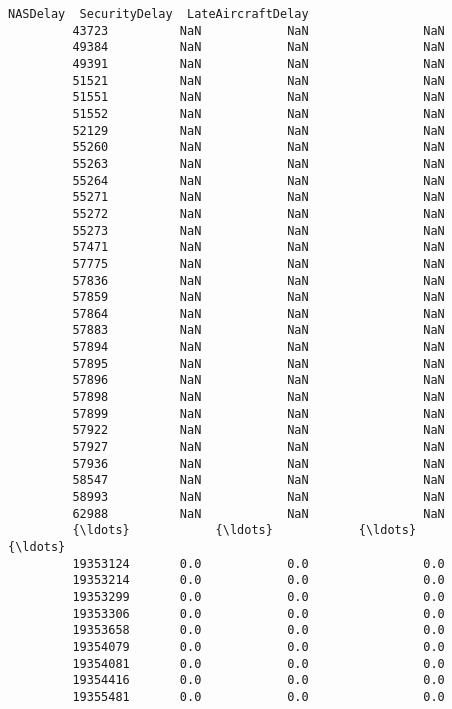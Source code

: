 \documentclass[11pt]{article}
\begin{document}
\begin{Verbatim}[commandchars=\\\{\}]
                   NASDelay  SecurityDelay  LateAircraftDelay  
         43723          NaN            NaN                NaN  
         49384          NaN            NaN                NaN  
         49391          NaN            NaN                NaN  
         51521          NaN            NaN                NaN  
         51551          NaN            NaN                NaN  
         51552          NaN            NaN                NaN  
         52129          NaN            NaN                NaN  
         55260          NaN            NaN                NaN  
         55263          NaN            NaN                NaN  
         55264          NaN            NaN                NaN  
         55271          NaN            NaN                NaN  
         55272          NaN            NaN                NaN  
         55273          NaN            NaN                NaN  
         57471          NaN            NaN                NaN  
         57775          NaN            NaN                NaN  
         57836          NaN            NaN                NaN  
         57859          NaN            NaN                NaN  
         57864          NaN            NaN                NaN  
         57883          NaN            NaN                NaN  
         57894          NaN            NaN                NaN  
         57895          NaN            NaN                NaN  
         57896          NaN            NaN                NaN  
         57898          NaN            NaN                NaN  
         57899          NaN            NaN                NaN  
         57922          NaN            NaN                NaN  
         57927          NaN            NaN                NaN  
         57936          NaN            NaN                NaN  
         58547          NaN            NaN                NaN  
         58993          NaN            NaN                NaN  
         62988          NaN            NaN                NaN  
         {\ldots}            {\ldots}            {\ldots}                {\ldots}  
         19353124       0.0            0.0                0.0  
         19353214       0.0            0.0                0.0  
         19353299       0.0            0.0                0.0  
         19353306       0.0            0.0                0.0  
         19353658       0.0            0.0                0.0  
         19354079       0.0            0.0                0.0  
         19354081       0.0            0.0                0.0  
         19354416       0.0            0.0                0.0  
         19355481       0.0            0.0                0.0  

\end{Verbatim}
\end{document}
